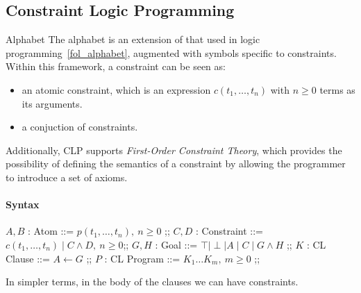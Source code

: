 \documentclass{article}
\begin{document}
\subsection{Constraint Logic Programming}
\begin{Definition}{Alphabet}{}
    The alphabet is an extension of that used in logic
    programming~\ref{fol_alphabet}, augmented with symbols specific to
    constraints. Within this framework, a constraint can be seen as:
    \begin{itemize}
        \item an atomic constraint, which is an expression
            $c(t_1,\ldots,t_n)$ with $n\geq0$ terms as its arguments.
        \item a conjuction of constraints.
    \end{itemize}
    Additionally, CLP supports \textit{First-Order Constraint Theory}, which
    provides the possibility of defining the semantics of a constraint by
    allowing the programmer to introduce a set of axioms.
\end{Definition}
\paragraph{Syntax}
\begin{center}
   \begin{bnf}
        $A,B$ : Atom ::= $p(t_1,\ldots,t_n),\ n\geq0$ ;;
        $C,D$ : Constraint ::= $c(t_1,\ldots,t_n)\mid C\land D,\ n\geq0$;;
        $G,H$ : Goal ::= $\top \mid \perp\mid A\mid C\mid G\land H$ ;;
        $K$ : CL Clause ::= $A\leftarrow G$ ;;
        $P$ : CL Program ::= $K_1\ldots K_m,\ m\geq0$ ;;
   \end{bnf} 
\end{center}
In simpler terms, in the body of the clauses we can have constraints.
\end{document}
